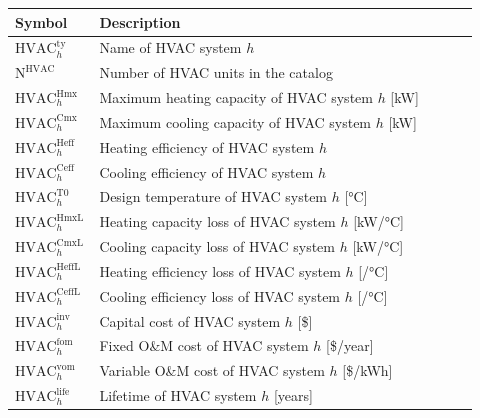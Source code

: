 \documentclass[11pt]{article}
\begin{document}
\begin{center}
\centering
\begin{tabular}{p{0.12\linewidth}p{0.8\linewidth}}
\hline
\textbf{Symbol} & \textbf{Description} \\
\hline
\(\text{HVAC}^\text{ty}_h\) & Name of HVAC system \(h\) \\
\(\text{N}^\text{HVAC}\) & Number of HVAC units in the catalog \\
\(\text{HVAC}^\text{Hmx}_h\) & Maximum heating capacity of HVAC system \(h\) [kW] \\
\(\text{HVAC}^\text{Cmx}_h\) & Maximum cooling capacity of HVAC system \(h\) [kW] \\
\(\text{HVAC}^\text{Heff}_h\) & Heating efficiency of HVAC system \(h\) \\
\(\text{HVAC}^\text{Ceff}_h\) & Cooling efficiency of HVAC system \(h\) \\
\(\text{HVAC}^\text{T0}_h\) & Design temperature of HVAC system \(h\) [°C] \\
\(\text{HVAC}^\text{HmxL}_h\) & Heating capacity loss of HVAC system \(h\) [kW/°C] \\
\(\text{HVAC}^\text{CmxL}_h\) & Cooling capacity loss of HVAC system \(h\) [kW/°C] \\
\(\text{HVAC}^\text{HeffL}_h\) & Heating efficiency loss of HVAC system \(h\) [/°C] \\
\(\text{HVAC}^\text{CeffL}_h\) & Cooling efficiency loss of HVAC system \(h\) [/°C] \\
\(\text{HVAC}^\text{inv}_h\) & Capital cost of HVAC system \(h\) [\$] \\
\(\text{HVAC}^\text{fom}_h\) & Fixed O\&M cost of HVAC system \(h\) [\$/year] \\
\(\text{HVAC}^\text{vom}_h\) & Variable O\&M cost of HVAC system \(h\) [\$/kWh] \\
\(\text{HVAC}^\text{life}_h\) & Lifetime of HVAC system \(h\) [years] \\
\hline
\end{tabular}
\captionsetup{type=table}
\label{tab:hvac_parameters}
\end{center}
\end{document}

